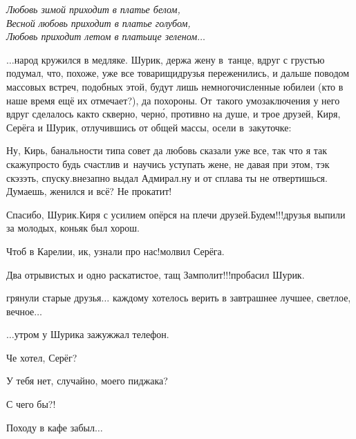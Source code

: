 {\vspace{0.1cm}
\noindent\textit{%
	\hspace*{1.4cm}Любовь зимой приходит в платье белом,\\
	\hspace*{1.4cm}Весной любовь приходит в платье голубом,\\
	\hspace*{1.4cm}Любовь приходит летом в платьице зеленом$\ldots$
}

$\ldots$народ кружился в медляке. Шурик, держа жену в~танце, вдруг с грустью подумал, что, похоже, уже все товарищи\sdash друзья переженились, и дальше поводом массовых встреч, подобных этой, будут лишь немногочисленные юбилеи (кто в наше время ещё их отмечает?), да похороны. От~такого умозаключения у него вдруг сделалось как\sdash то скверно, черн\'{о}, противно на душе, и трое друзей, Киря, Серёга и Шурик, отлучившись от общей массы, осели в~закуточке:

\diagdash Ну, Кирь, банальности типа совет да любовь сказали уже все, так что я так скажу\mdash просто будь счастлив и~научись уступать жене, не давая при этом, тэк скэзэть, спуску.\mdash внезапно выдал Адмирал.\mdash ну и от сплава ты не отвертишься. Думаешь, женился и всё? Не прокатит!

\diagdash Спасибо, Шурик.\mdash Киря с усилием опёрся на плечи друзей.\mdash Будем!!!\mdash друзья выпили за молодых, коньяк был хорош.

\diagdash Чтоб в Карелии, ик, узнали про нас!\mdash молвил Серёга.

\diagdash Два отрывистых и одно раскатистое, тащ Замполит!!!\mdash пробасил Шурик.

\mdash грянули старые друзья$\ldots$ каждому хотелось верить в завтрашнее лучшее, светлое, вечное$\ldots$

\vspace{1.5cm}

$\ldots$утром у Шурика зажужжал телефон. 

\diagdash Че хотел, Серёг?

\diagdash У тебя нет, случайно, моего пиджака?

\diagdash С чего бы?!

\diagdash Походу в кафе забыл$\ldots$

\begin{center}
\end{center}
}